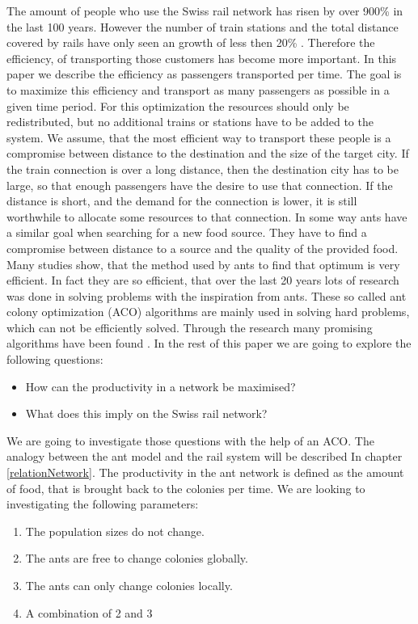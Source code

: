 The amount of people who use the Swiss rail network has risen by over 900\% in the last 100 years. However the number of train stations and the total distance covered by rails have only seen an growth of less then 20\% \citep{SbbStats}. Therefore the efficiency, of transporting those customers has become more important. In this paper we describe the efficiency as passengers transported per time. The goal is to maximize this efficiency and transport as many passengers as possible in a given time period. For this optimization the resources should only be redistributed, but no additional trains or stations have to be added to the system. 
We assume, that the most efficient way to transport these people is a compromise between distance to the destination and the size of the target city. If the train connection is over a long distance, then the destination city has to be large, so that enough passengers have the desire to use that connection. If the distance is short, and the demand for the connection is lower, it is still worthwhile to allocate some resources to that connection.
In some way ants have a similar goal when searching for a new food source. They have to find a compromise between distance to a source and the quality of the provided food. Many studies show, that the method used by ants to find that optimum is very efficient. In fact they are so efficient, that over the last 20 years lots of research was done in solving problems with the inspiration from ants. These so called ant colony optimization (ACO) algorithms are mainly used in solving hard problems, which can not be efficiently solved. Through the research many promising algorithms have been found \citep{Aco1}.
In the rest of this paper we are going to explore the following questions:
\begin{itemize}
  \item How can the productivity in a network be maximised?
  \item What does this imply on the Swiss rail network?
\end{itemize}
We are going to investigate those questions with the help of an ACO. The analogy between the ant model and the rail system will be described In chapter \ref{relationNetwork}. The productivity in the ant network is defined as the amount of food, that is brought back to the colonies per time. We are looking to investigating the following parameters:
\begin{enumerate}
	\item The population sizes do not change.
	\item The ants are free to change colonies globally.
	\item The ants can only change colonies locally.
	\item A combination of 2 and 3
\end{enumerate}
